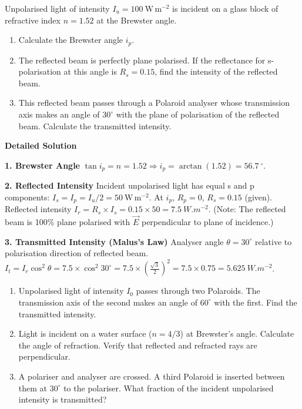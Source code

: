 \documentclass[11pt]{article}
\begin{document}
\begin{exoresolu}
Unpolarised light of intensity $I_u = 100\ \mathrm{W\,m^{-2}}$ is incident on a glass block of refractive index $n = 1.52$ at the Brewster angle.
\begin{enumerate}
\item Calculate the Brewster angle $i_p$.
\item The reflected beam is perfectly plane polarised. If the reflectance for s-polarisation at this angle is $R_s = 0.15$, find the intensity of the reflected beam.
\item This reflected beam passes through a Polaroid analyser whose transmission axis makes an angle of $30^\circ$ with the plane of polarisation of the reflected beam. Calculate the transmitted intensity.
\end{enumerate}
\tcblower
\textbf{Detailed Solution}

\textbf{1. Brewster Angle}
$\tan i_p = n = 1.52 \Rightarrow i_p = \arctan(1.52) = \SI{56.7}{\ensuremath{{}^{\circ}}}$.

\textbf{2. Reflected Intensity}
Incident unpolarised light has equal s and p components: $I_s = I_p = I_u/2 = 50\ \mathrm{W\,m^{-2}}$.
At $i_p$, $R_p = 0$, $R_s = 0.15$ (given).
Reflected intensity $I_r = R_s \times I_s = 0.15 \times 50 = \SI{7.5}{W.m^{-2}}$.
(Note: The reflected beam is 100\% plane polarised with $\vec{E}$ perpendicular to plane of incidence.)

\textbf{3. Transmitted Intensity (Malus's Law)}
Analyser angle $\theta = 30^\circ$ relative to polarisation direction of reflected beam.
$I_t = I_r \cos^2\theta = 7.5 \times \cos^2 30^\circ = 7.5 \times (\frac{\sqrt{3}}{2})^2 = 7.5 \times 0.75 = \SI{5.625}{W.m^{-2}}$.
\end{exoresolu}

\begin{exercice}
\begin{enumerate}
\item Unpolarised light of intensity $I_0$ passes through two Polaroids. The transmission axis of the second makes an angle of $60^\circ$ with the first. Find the transmitted intensity.
\item Light is incident on a water surface ($n=4/3$) at Brewster's angle. Calculate the angle of refraction. Verify that reflected and refracted rays are perpendicular.
\item A polariser and analyser are crossed. A third Polaroid is inserted between them at $30^\circ$ to the polariser. What fraction of the incident unpolarised intensity is transmitted?
\end{enumerate}
\end{exercice}
\end{document}
